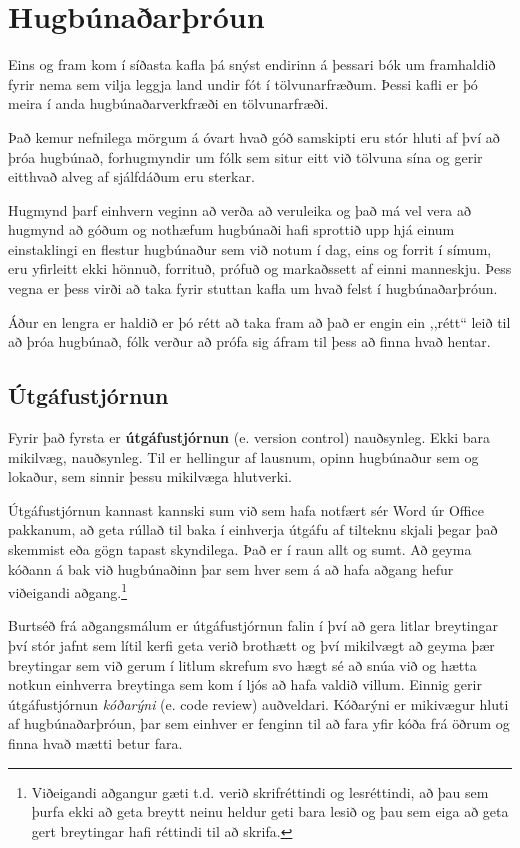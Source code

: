 
\chapter{Hugbúnaðarþróun}\label{k:dev}
Eins og fram kom í síðasta kafla þá snýst endirinn á þessari bók um framhaldið fyrir nema sem vilja leggja land undir fót í tölvunarfræðum.
Þessi kafli er þó meira í anda hugbúnaðarverkfræði en tölvunarfræði.

Það kemur nefnilega mörgum á óvart hvað góð samskipti eru stór hluti af því að þróa hugbúnað, forhugmyndir um fólk sem situr eitt við tölvuna sína og gerir eitthvað alveg af sjálfdáðum eru sterkar.

Hugmynd þarf einhvern veginn að verða að veruleika og það má vel vera að hugmynd að góðum og nothæfum hugbúnaði hafi sprottið upp hjá einum einstaklingi en flestur hugbúnaður sem við notum í dag, eins og forrit í símum, eru yfirleitt ekki hönnuð, forrituð, prófuð og markaðssett af einni manneskju.
Þess vegna er þess virði að taka fyrir stuttan kafla um hvað felst í hugbúnaðarþróun.

Áður en lengra er haldið er þó rétt að taka fram að það er engin ein ,,rétt“ leið til að þróa hugbúnað, fólk verður að prófa sig áfram til þess að finna hvað hentar.

\section{Útgáfustjórnun}
Fyrir það fyrsta er \textbf{útgáfustjórnun} (e. version control) nauðsynleg.
Ekki bara mikilvæg, nauðsynleg.
Til er hellingur af lausnum, opinn hugbúnaður sem og lokaður, sem sinnir þessu mikilvæga hlutverki.

Útgáfustjórnun kannast kannski sum við sem hafa notfært sér Word úr Office pakkanum, að geta rúllað til baka í einhverja útgáfu af tilteknu skjali þegar það skemmist eða gögn tapast skyndilega.
Það er í raun allt og sumt.
Að geyma kóðann á bak við hugbúnaðinn þar sem hver sem á að hafa aðgang hefur viðeigandi aðgang.\footnote{Viðeigandi aðgangur gæti t.d. verið skrifréttindi og lesréttindi, að þau sem þurfa ekki að geta breytt neinu heldur geti bara lesið og þau sem eiga að geta gert breytingar hafi réttindi til að skrifa.}

Burtséð frá aðgangsmálum er útgáfustjórnun falin í því að gera litlar breytingar því stór jafnt sem lítil kerfi geta verið brothætt og því mikilvægt að geyma þær breytingar sem við gerum í litlum skrefum svo hægt sé að snúa við og hætta notkun einhverra breytinga sem kom í ljós að hafa valdið villum.
Einnig gerir útgáfustjórnun \textit{kóðarýni} (e. code review) auðveldari.
Kóðarýni er mikivægur hluti af hugbúnaðarþróun, þar sem einhver er fenginn til að fara yfir kóða frá öðrum og finna hvað mætti betur fara.

